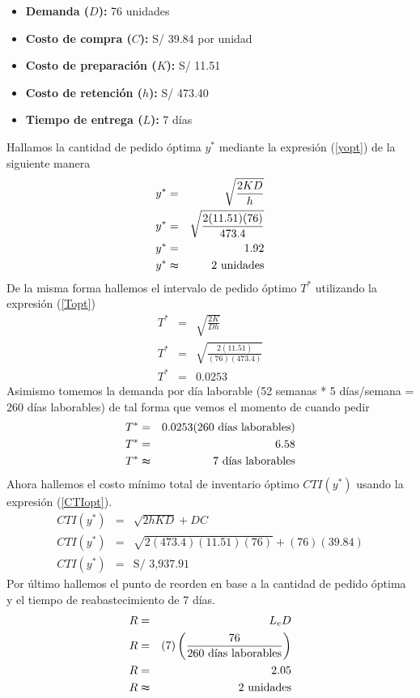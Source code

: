 \begin{itemize}
    \item \textbf{Demanda ($D$):} 76 unidades
    \item \textbf{Costo de compra ($C$):} S/ 39.84 por unidad
    \item \textbf{Costo de preparación ($K$):} S/ 11.51
    \item \textbf{Costo de retención ($h$):} S/ 473.40
    \item \textbf{Tiempo de entrega ($L$):} 7 días
\end{itemize}

Hallamos la cantidad de pedido óptima $y^*$ mediante la expresión (\ref{yopt}) de la siguiente manera
\clearpage
\begin{eqnarray}
    y^* &=& \sqrt{\frac{2KD}{h}} \nonumber \\
    y^* &=& \sqrt{\frac{2(11.51)(76)}{473.4}} \nonumber \\
    y^* &=& 1.92 \nonumber \\
    y^* &\thickapprox& 2 \text{ unidades} \nonumber
\end{eqnarray}
De la misma forma hallemos el intervalo de pedido óptimo $T^*$ utilizando la expresión (\ref{Topt}) 
\begin{eqnarray}
    T^* &=& \sqrt{\frac{2K}{Dh}} \nonumber \\
    T^* &=& \sqrt{\frac{2(11.51)}{(76)(473.4)}} \nonumber \\
    T^* &=& 0.0253 \nonumber
\end{eqnarray}
Asimismo tomemos la demanda por día laborable (52 semanas * 5 días/semana = 260 días laborables) de tal forma que vemos el momento de cuando pedir
\begin{eqnarray}
    T^* &=& 0.0253 (260 \text{ días laborables}) \nonumber \\   
    T^* &=& 6.58 \nonumber \\
    T^* &\thickapprox& 7 \text{ días laborables} \nonumber
\end{eqnarray}
Ahora hallemos el costo mínimo total de inventario óptimo $CTI(y^*)$ usando la expresión (\ref{CTIopt}).
\begin{eqnarray}
    CTI(y^*) &=& \sqrt{2hKD} + DC \nonumber \\
    CTI(y^*) &=& \sqrt{2(473.4)(11.51)(76)} + (76)(39.84) \nonumber \\
    CTI(y^*) &=& \text{S/ 3,937.91} \nonumber
\end{eqnarray}
Por último hallemos el punto de reorden en base a la cantidad de pedido óptima y el tiempo de reabastecimiento de 7 días.
\clearpage
\begin{eqnarray}
    R &=& L_e D \nonumber \\
    R &=& (7) \left(\frac{76}{260 \text{ días laborables}} \right) \nonumber \\
    R &=& 2.05 \nonumber \\
    R &\thickapprox& 2 \text{ unidades} \nonumber
\end{eqnarray}

